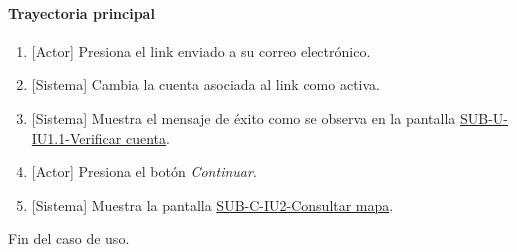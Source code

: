 \paragraph{Trayectoria principal}
	\begin{enumerate}
		\item {[Actor]} Presiona el link enviado a su correo electrónico.
		\item {[Sistema]} Cambia la cuenta asociada al link como activa.
		\item {[Sistema]} Muestra el mensaje de éxito como se observa en la pantalla \hyperref[fig:sub-u-iu1.1]{SUB-U-IU1.1-Verificar cuenta}.
		\item {[Actor]} Presiona el botón \textit{Continuar}.
		\item {[Sistema]} Muestra la pantalla \hyperref[fig:sub-c-iu2]{SUB-C-IU2-Consultar mapa}.
	\end{enumerate}
	Fin del caso de uso.

